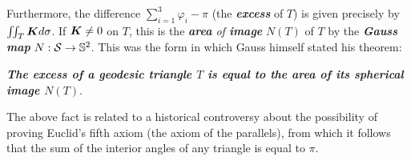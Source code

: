 \documentclass[11pt]{article}
\begin{document}
\begin{itemize}
\begin{remark}
Furthermore, the difference $\sum_{i=1}^{3}\varphi_{i} - \pi$ (the \emph{\textbf{excess}} of $T$) is given precisely  by $\iint_{T}\boldsymbol{K}d\sigma$. If $\boldsymbol{K} \neq 0$ on $T$, this is the \emph{\textbf{area} of \textbf{image}} $N(T)$ of $T$ by the \emph{\textbf{Gauss map}} $N: {\mathcal S} \rightarrow {\mathbb S}^2$. This was the form in which Gauss himself stated his theorem: 

\emph{\textbf{The excess of a geodesic triangle $T$ is equal to the area of its spherical image $N(T)$}}.

The above fact is related to a historical controversy about the possibility of proving Euclid’s fifth axiom (the axiom of the parallels), from which it follows that the sum of the interior angles of any triangle is equal to $\pi$. 
\end{remark}

\end{itemize}


\newpage


\end{document}
